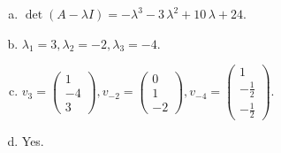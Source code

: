 \begin{questions}
\begin{solution}
\begin{enumerate}[(a)]
\item $\det(A-\lambda I)=-{\lambda}^{3} - 3 \, {\lambda}^{2} + 10 \, {\lambda} + 24$.
\item ${\lambda}_1=3, {\lambda}_2=-2, {\lambda}_3=-4$.
\item $v_{3}=\left(\begin{array}{r}
1 \\
-4 \\
3
\end{array}\right), v_{-2}=\left(\begin{array}{r}
0 \\
1 \\
-2
\end{array}\right), v_{-4}=\left(\begin{array}{r}
1 \\
-\frac{1}{2} \\
-\frac{1}{2}
\end{array}\right)$.
\item Yes.
\end{enumerate}
\end{solution}

\end{questions}

\newpage


\begin{center}
\end{center}

